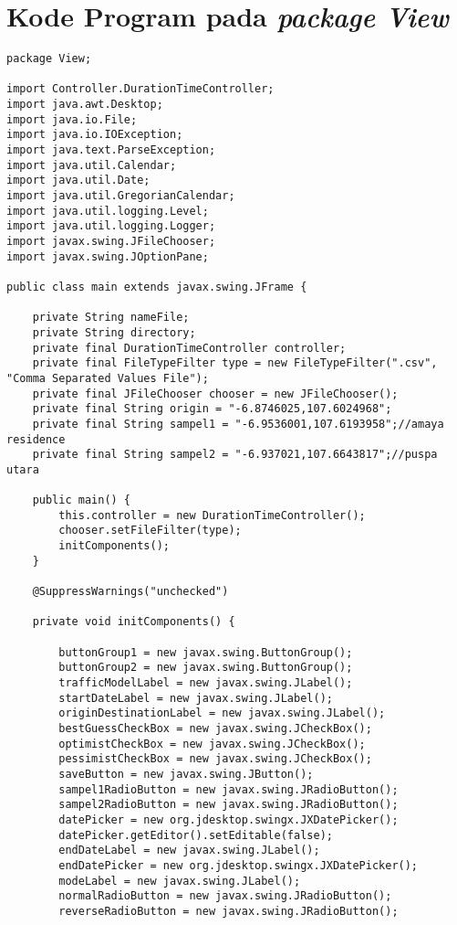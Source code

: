 \chapter{Kode Program pada \textit{package View}}
\label{chap:kodeprogramC}

\begin{lstlisting}[caption= main.java]
package View;

import Controller.DurationTimeController;
import java.awt.Desktop;
import java.io.File;
import java.io.IOException;
import java.text.ParseException;
import java.util.Calendar;
import java.util.Date;
import java.util.GregorianCalendar;
import java.util.logging.Level;
import java.util.logging.Logger;
import javax.swing.JFileChooser;
import javax.swing.JOptionPane;

public class main extends javax.swing.JFrame {

    private String nameFile;
    private String directory;
    private final DurationTimeController controller;
    private final FileTypeFilter type = new FileTypeFilter(".csv", "Comma Separated Values File");
    private final JFileChooser chooser = new JFileChooser();
    private final String origin = "-6.8746025,107.6024968";
    private final String sampel1 = "-6.9536001,107.6193958";//amaya residence
    private final String sampel2 = "-6.937021,107.6643817";//puspa utara

    public main() {
        this.controller = new DurationTimeController();
        chooser.setFileFilter(type);
        initComponents();
    }

    @SuppressWarnings("unchecked")
                          
    private void initComponents() {

        buttonGroup1 = new javax.swing.ButtonGroup();
        buttonGroup2 = new javax.swing.ButtonGroup();
        trafficModelLabel = new javax.swing.JLabel();
        startDateLabel = new javax.swing.JLabel();
        originDestinationLabel = new javax.swing.JLabel();
        bestGuessCheckBox = new javax.swing.JCheckBox();
        optimistCheckBox = new javax.swing.JCheckBox();
        pessimistCheckBox = new javax.swing.JCheckBox();
        saveButton = new javax.swing.JButton();
        sampel1RadioButton = new javax.swing.JRadioButton();
        sampel2RadioButton = new javax.swing.JRadioButton();
        datePicker = new org.jdesktop.swingx.JXDatePicker();
        datePicker.getEditor().setEditable(false);
        endDateLabel = new javax.swing.JLabel();
        endDatePicker = new org.jdesktop.swingx.JXDatePicker();
        modeLabel = new javax.swing.JLabel();
        normalRadioButton = new javax.swing.JRadioButton();
        reverseRadioButton = new javax.swing.JRadioButton();


\end{lstlisting}
